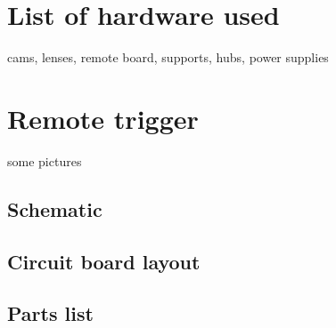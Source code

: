 \section{List of hardware used}

cams, lenses, remote board, supports, hubs, power supplies

\section{Remote trigger}

some pictures

\subsection{Schematic}

\subsection{Circuit board layout}

\subsection{Parts list}
